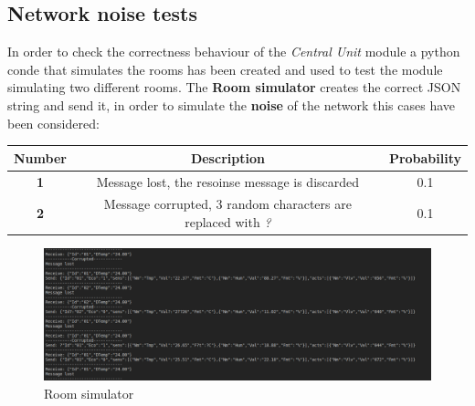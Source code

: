 \subsection{Network noise tests}
In order to check the correctness behaviour of the \textit{Central Unit} module a python conde that simulates the rooms has been created and used to test the module simulating two different rooms.
The \textbf{Room simulator} creates the correct JSON string and send it, in order to simulate the \textbf{noise} of the network this cases have been considered:
\begin{center}
	\begin{tabular}{||c | c | c ||} 
		\hline
		Number			& 	Description & Probability\\ 
		\hline
		\textbf{1}		&	Message lost, the resoinse message is discarded & 0.1 \\ 
		\hline
		\textbf{2}		&	Message corrupted, 3 random characters are replaced with \textit{?} & 0.1\\ 
		\hline
	\end{tabular}
\end{center}
\begin{figure}[H]
	\centering
	\includegraphics[width=12cm,keepaspectratio]{img/room_simulator}
	\caption{Room simulator}
	\label{fig:roomsimulator}
\end{figure}